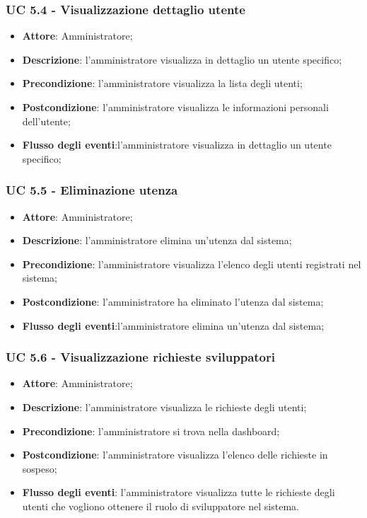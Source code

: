 \subsubsection{UC 5.4 - Visualizzazione dettaglio utente}
\begin{itemize}
\item \textbf{Attore}: Amministratore;
\item \textbf{Descrizione}: l'amministratore visualizza in dettaglio un utente specifico;
\item \textbf{Precondizione}: l'amministratore visualizza la lista degli utenti;
\item \textbf{Postcondizione}: l'amministratore visualizza le informazioni personali dell'utente;
\item \textbf{Flusso degli eventi}:l'amministratore visualizza in dettaglio un utente specifico;
\end{itemize}


\subsubsection{UC 5.5 - Eliminazione utenza}
\begin{itemize}
\item \textbf{Attore}: Amministratore;
\item \textbf{Descrizione}: l'amministratore elimina un'utenza dal sistema;
\item \textbf{Precondizione}: l'amministratore visualizza l'elenco degli utenti registrati nel sistema;
\item \textbf{Postcondizione}: l'amministratore ha eliminato l'utenza dal sistema;
\item \textbf{Flusso degli eventi}:l'amministratore elimina un'utenza dal sistema;
\end{itemize}


\subsubsection{UC 5.6 - Visualizzazione richieste sviluppatori}
\begin{itemize}
\item \textbf{Attore}: Amministratore;
\item \textbf{Descrizione}: l'amministratore visualizza le richieste degli utenti;
\item \textbf{Precondizione}: l'amministratore si trova nella dashboard;
\item \textbf{Postcondizione}: l'amministratore visualizza l'elenco delle richieste in sospeso;
\item \textbf{Flusso degli eventi}:  l'amministratore visualizza tutte le richieste degli utenti che vogliono ottenere il ruolo di sviluppatore nel sistema.
\end{itemize}

